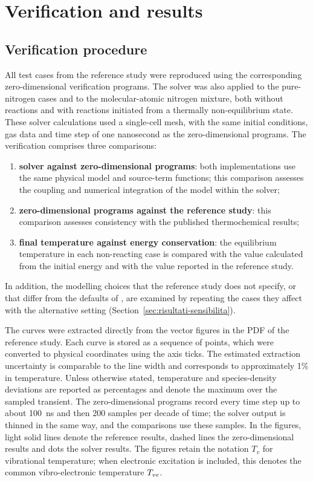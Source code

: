 \section{Verification and results}
\label{sec:risultati}

\subsection{Verification procedure}
\label{sec:metodo}

All test cases from the reference study were reproduced using the corresponding
zero-dimensional verification programs. The solver was also applied to the
pure-nitrogen cases and to the molecular-atomic nitrogen mixture, both without
reactions and with reactions initiated from a thermally non-equilibrium state.
These solver calculations used a single-cell mesh, with the same initial
conditions, gas data and time step of one nanosecond as the zero-dimensional
programs. The verification comprises three comparisons:

\begin{enumerate}[leftmargin=1.8em]
  \item \textbf{solver against zero-dimensional programs}: both
    implementations use the same physical model and source-term functions;
    this comparison assesses the coupling and numerical integration of the
    model within the solver;
  \item \textbf{zero-dimensional programs against the reference study}:
    this comparison assesses consistency with the published thermochemical
    results;
  \item \textbf{final temperature against energy conservation}: the
    equilibrium temperature in each non-reacting case is compared with the
    value calculated from the initial energy and with the value reported in
    the reference study.
\end{enumerate}

In addition, the modelling choices that the reference study does not specify,
or that differ from the defaults of \mpp{}, are examined by repeating the
cases they affect with the alternative setting
(Section~\ref{sec:risultati-sensibilita}).

The \hyfoam{} curves were extracted directly from the vector figures in the
PDF of the reference study. Each curve is stored as a sequence of points,
which were converted to physical coordinates using the axis ticks. The
estimated extraction uncertainty is comparable to the line width and
corresponds to approximately 1\% in temperature. Unless otherwise stated,
temperature and species-density deviations are reported as percentages and
denote the maximum over the sampled transient. The zero-dimensional programs
record every time step up to about 100~ns and then 200 samples per decade of
time; the solver output is thinned in the same way, and the comparisons use
these samples. In the
figures, light solid lines denote the reference results, dashed lines the
zero-dimensional results and dots the solver results. The figures retain the
notation $T_v$ for vibrational temperature; when electronic excitation is
included, this denotes the common vibro-electronic temperature $T_{ve}$.

